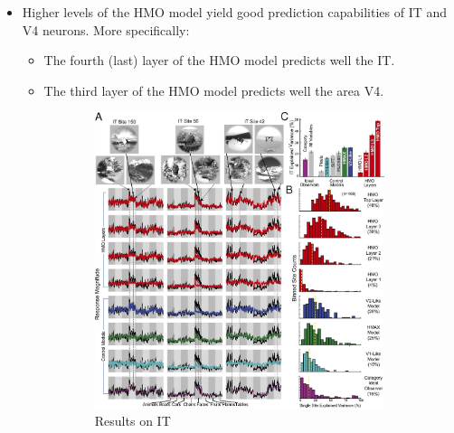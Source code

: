 \begin{casestudy}
\begin{descriptionlist}
\begin{itemize}
                \item Higher levels of the HMO model yield good prediction capabilities of IT and V4 neurons.
                    More specifically:
                    \begin{itemize}
                        \item The fourth (last) layer of the HMO model predicts well the IT.
                        \item The third layer of the HMO model predicts well the area V4.
                    \end{itemize}
                    \begin{figure}[H]
                        \centering
                        \begin{subfigure}{0.6\linewidth}
                            \centering
                            \includegraphics[width=\linewidth]{./img/vision_nn_prediction_it.png}
                            \caption{Results on IT}
                        \end{subfigure}
                        \begin{subfigure}{0.38\linewidth}
                            \centering

\end{subfigure}
\end{figure}
\end{itemize}
\end{descriptionlist}
\end{casestudy}
